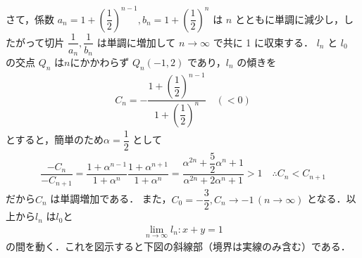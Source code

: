 \documentclass[../../main.tex]{subfiles}
\begin{document}
さて，係数 $a_n = 1+\left(\dfrac{1}{2}\right)^{n-1}, b_n = 1+\left(\dfrac{1}{2}\right)^n$ は $n$ とともに単調に減少し，したがって切片 $\dfrac{1}{a_n}, \dfrac{1}{b_n}$ は単調に増加して $n\to\infty$ で共に 1 に収束する．
$l_n$ と $l_{0}$ の交点 $Q_n$ は$n$にかかわらず $Q_n(-1, 2)$ であり，$l_n$ の傾きを
\begin{align}
  C_n = -\dfrac{1+\left(\dfrac{1}{2}\right)^{n-1}}{1+\left(\dfrac{1}{2}\right)^n}
  \quad (<0)
\end{align}
とすると，簡単のため$\alpha = \dfrac{1}{2}$ として
\begin{align}
  \dfrac{-C_n}{-C_{n+1}}
  = \dfrac{1+\alpha^{n-1}}{1+\alpha^n}\dfrac{1+\alpha^{n+1}}{1+\alpha^{n}}
  = \dfrac{\alpha^{2n} + \dfrac{5}{2}\alpha^n + 1}{\alpha^{2n} + 2\alpha^n + 1} > 1
  \quad \therefore
  C_n < C_{n+1}
\end{align}
だから$C_n$ は単調増加である．
また，$C_0 = -\dfrac{3}{2}, C_n \to -1 \, (n \to \infty)$ となる．以上から$l_n$ は$l_0$と
\begin{align}
  \lim_{n\to\infty}l_n: x+y=1
\end{align}
の間を動く．これを図示すると下図の斜線部（境界は実線のみ含む）である．
\end{document}
